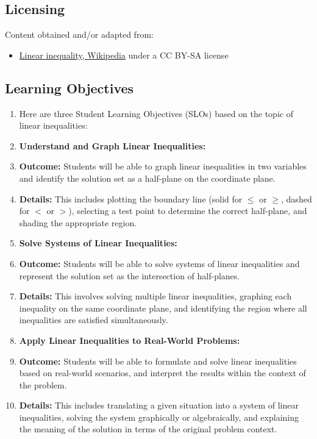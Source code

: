 \subsection{Licensing}
\label{sss:lice-7351}




Content obtained and/or adapted from:



\begin{itemize}
    \item \href{https://en.wikipedia.org/wiki/Linear_inequality}{Linear inequality, Wikipedia} under a CC BY-SA license
\end{itemize}


\subsection{Learning Objectives}
\label{ssec:lear-fe6e}


\begin{enumerate}
    \item Here are three Student Learning Objectives (SLOs) based on the topic of linear inequalities:
    \item \textbf{Understand and Graph Linear Inequalities:}
    \item \textbf{Outcome:} Students will be able to graph linear inequalities in two variables and identify the solution set as a half-plane on the coordinate plane.
    \item \textbf{Details:} This includes plotting the boundary line (solid for $\leq$ or $\geq$, dashed for $<$ or $>$), selecting a test point to determine the correct half-plane, and shading the appropriate region.
    \item \textbf{Solve Systems of Linear Inequalities:}
    \item \textbf{Outcome:} Students will be able to solve systems of linear inequalities and represent the solution set as the intersection of half-planes.
    \item \textbf{Details:} This involves solving multiple linear inequalities, graphing each inequality on the same coordinate plane, and identifying the region where all inequalities are satisfied simultaneously.
    \item \textbf{Apply Linear Inequalities to Real-World Problems:}
    \item \textbf{Outcome:} Students will be able to formulate and solve linear inequalities based on real-world scenarios, and interpret the results within the context of the problem.
    \item \textbf{Details:} This includes translating a given situation into a system of linear inequalities, solving the system graphically or algebraically, and explaining the meaning of the solution in terms of the original problem context.
\end{enumerate}


